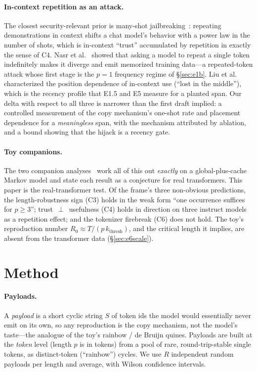 \documentclass[11pt]{article}
\theoremstyle{plain}
\theoremstyle{definition}
\theoremstyle{remark}
\begin{document}
\paragraph{In-context repetition as an attack.} The closest security-relevant prior is
many-shot jailbreaking~\cite{anil2024}: repeating demonstrations in context shifts a chat model's
behavior with a power law in the number of shots, which is in-context ``trust'' accumulated by
repetition in exactly the sense of C4. Nasr et al.~\cite{nasr2023} showed that asking a model
to repeat a single token indefinitely makes it diverge and emit memorized training data---a
repeated-token attack whose first stage is the $p{=}1$ frequency regime of \S\ref{sec:e1b}. Liu
et al.~\cite{liu2023} characterized the position dependence of in-context use (``lost in the
middle''), which is the recency profile that E1.5 and E5 measure for a planted span. Our delta
with respect to all three is narrower than the first draft implied: a controlled measurement of
the copy mechanism's one-shot rate and placement dependence for a \emph{meaningless} span, with
the mechanism attributed by ablation, and a bound showing that the hijack is a recency gate.

\paragraph{Toy companions.} The two companion analyses~\cite{shumow2026trust,shumow2026contagion}
work all of this out \emph{exactly} on a global-plus-cache Markov model and state each result as a
conjecture for real transformers. This paper is the real-transformer test. Of the frame's three
non-obvious predictions, the length-robustness sign (C3) holds in the weak form ``one occurrence
suffices for $p\ge3$''; trust~$\perp$~usefulness (C4) holds in direction on three instruct models
as a repetition effect; and the tokenizer firebreak (C6) does not hold. The toy's reproduction
number $R_0\approx T/(p\,k_{\mathrm{thresh}})$, and the critical length it implies, are absent
from the transformer data (\S\ref{sec:e6scale}).

\section{Method}\label{sec:method}
\paragraph{Payloads.} A \emph{payload} is a short cyclic string $S$ of token ids the model
would essentially never emit on its own, so any reproduction is the copy mechanism, not the
model's taste---the analogue of the toy's rainbow / de Bruijn quines. Payloads are built at
the \emph{token} level (length $p$ is in tokens) from a pool of rare, round-trip-stable
single tokens, as distinct-token (``rainbow'') cycles. We use $R$ independent random
payloads per length and average, with Wilson confidence intervals.
\end{document}
